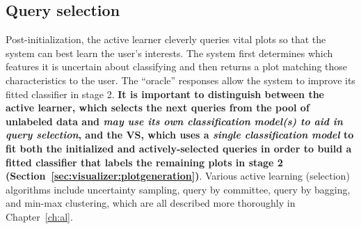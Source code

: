 \subsection{Query selection}
\label{sec:visualizer:al:tree}

Post-initialization, the active learner cleverly queries vital plots so that 
the system can best learn the user's interests. The system first determines 
which features it is uncertain about classifying and then returns a plot 
matching those characteristics to the user. The ``oracle'' responses allow the 
system to improve its fitted classifier in stage 2. 
\textbf{It is important to distinguish between the active learner, which 
selects the next queries from the pool of unlabeled data and \textit{may 
use its own classification model(s) to aid in query selection}, and the VS, 
which uses a \textit{single classification model} to fit both the 
initialized and actively-selected queries in order to build a fitted classifier 
that labels the remaining plots in stage 2 
(Section~\ref{sec:visualizer:plotgeneration})}. 
Various active learning (selection) algorithms include uncertainty sampling, 
query by committee, query by bagging, and min-max clustering, which are all
described more thoroughly in Chapter~\ref{ch:al}.